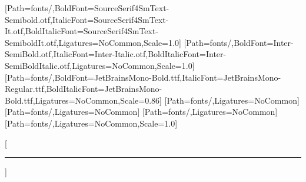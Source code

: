 \usepackage{titlesec}
\usepackage{enumitem}
\usepackage{fancyhdr}
\usepackage{lastpage}
\usepackage{refcount}
\usepackage{xurl}
\setmainfont{SourceSerif4SmText-Regular.otf}[Path=fonts/,BoldFont=SourceSerif4SmText-Semibold.otf,ItalicFont=SourceSerif4SmText-It.otf,BoldItalicFont=SourceSerif4SmText-SemiboldIt.otf,Ligatures=NoCommon,Scale=1.0]
\setsansfont{Inter-Regular.otf}[Path=fonts/,BoldFont=Inter-SemiBold.otf,ItalicFont=Inter-Italic.otf,BoldItalicFont=Inter-SemiBoldItalic.otf,Ligatures=NoCommon,Scale=1.0]
\setmonofont{JetBrainsMono-Regular.ttf}[Path=fonts/,BoldFont=JetBrainsMono-Bold.ttf,ItalicFont=JetBrainsMono-Regular.ttf,BoldItalicFont=JetBrainsMono-Bold.ttf,Ligatures=NoCommon,Scale=0.86]
\newfontfamily{}[Path=fonts/,Ligatures=NoCommon]
\newfontfamily{}[Path=fonts/,Ligatures=NoCommon]
\newfontfamily{}[Path=fonts/,Ligatures=NoCommon]
\newfontfamily{}[Path=fonts/,Ligatures=NoCommon,Scale=1.0]
\renewcommand{\normalsize}{\fontsize{10.75pt}{14.75pt}\selectfont}
\setlength{\parskip}{5pt}
\setlength{\parindent}{0pt}
\AtBeginDocument{\raggedright\hyphenpenalty=10000\exhyphenpenalty=10000\emergencystretch=1.5em\color{BobInk}\normalsize}
\renewcommand{\maketitle}{}
\titleformat{\section}{\sffamily\bfseries\fontsize{15pt}{18pt}\selectfont\color{BobInk}}{}{0pt}{}[\vspace{2pt}\textcolor{BobRule}{\rule{\linewidth}{1pt}}]
